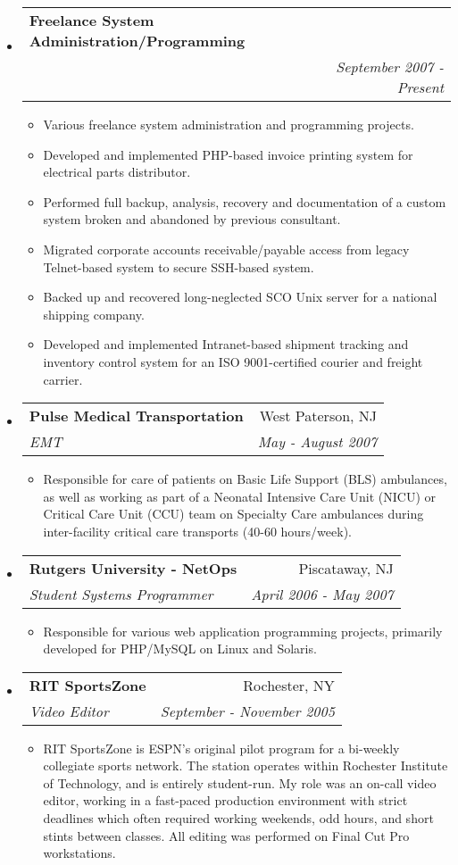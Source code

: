 \documentclass[letterpaper,11pt]{article}
\makeatletter
\newcommand{\resitem}[1]{\item #1 \vspace{-2pt}}
\newcommand{\ressubheading}[4]{
\begin{tabular*}{7.0in}{l@{\extracolsep{\fill}}r}
		\textbf{#1} & #2 \\
		\textit{#3} & \textit{#4} \\
\end{tabular*}\vspace{-6pt}}
\makeatother
\begin{document}
\begin{itemize}
\item
        \ressubheading{Freelance System Administration/Programming}{ }{ }{September 2007 - Present}
        \begin{itemize}
               \resitem{Various freelance system administration and
                 programming projects.}
               \resitem{Developed and implemented PHP-based invoice printing
                 system for electrical parts distributor.}
               \resitem{Performed full backup, analysis, recovery and documentation of a
                 custom system broken and abandoned by previous consultant.}
               \resitem{Migrated corporate accounts receivable/payable access
                 from legacy Telnet-based system to secure SSH-based system.}
               \resitem{Backed up and recovered long-neglected SCO Unix server
                 for a national shipping company.}
               \resitem{Developed and implemented Intranet-based shipment tracking and
                 inventory control system for an ISO 9001-certified courier
                 and freight carrier.}
        \end{itemize}

\item
        \ressubheading{Pulse Medical Transportation}{West Paterson, NJ}{EMT}{May - August 2007}
        \begin{itemize}
                \resitem{Responsible for care of patients on Basic Life
                  Support (BLS) ambulances, as well as working as part of a
                  Neonatal Intensive Care Unit (NICU) or Critical Care Unit
                  (CCU) team on Specialty Care
                  ambulances during inter-facility critical care transports
                  (40-60 hours/week).}
        \end{itemize}

\item
	\ressubheading{Rutgers University - NetOps}{Piscataway, NJ}{Student Systems Programmer}{April 2006 - May 2007}
	\begin{itemize}
		\resitem{Responsible for various web application programming projects, primarily developed for
                  PHP/MySQL on Linux and Solaris.}
	\end{itemize}

\item
        \ressubheading{RIT SportsZone}{Rochester, NY}{Video Editor}{September - November 2005}
        \begin{itemize}
                \resitem{RIT SportsZone is ESPN’s original pilot program for a
                bi-weekly collegiate sports network. The station operates
                within Rochester Institute of Technology, and is entirely
                student-run. My role was an on-call video editor, working in a
                fast-paced production environment with strict deadlines which
                often required working weekends, odd hours, and short stints
                between classes. All editing was performed on Final Cut Pro
                workstations. }
        \end{itemize}


\end{itemize}
\end{document}
